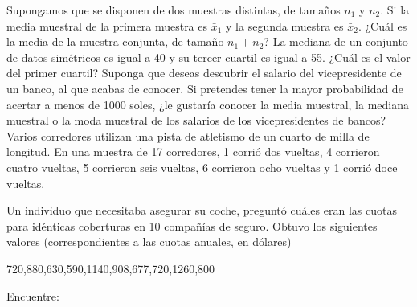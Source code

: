 \documentclass{exam}
\begin{document}
\begin{questions}
\question Supongamos que se disponen de dos muestras distintas, de tamaños $n_1$ y $n_2$. Si la media muestral de la primera muestra es $\bar{x}_1$ y la segunda muestra es $\bar{x}_2$. ¿Cuál es la media de la muestra conjunta, de tamaño $n_1+n_2$?
\question La mediana de un conjunto de datos simétricos es igual a 40 y su tercer cuartil es igual a 55. ¿Cuál es el valor del primer cuartil?
\question Suponga que deseas descubrir el salario del vicepresidente de un banco, al que acabas de conocer. Si pretendes tener la mayor probabilidad de acertar a menos de 1000 soles, ¿le gustaría conocer la media muestral, la mediana muestral o la moda muestral de los salarios de los vicepresidentes de bancos?
\question Varios corredores utilizan una pista de atletismo de un cuarto de milla de longitud. En una muestra de 17 corredores, 1 corrió dos vueltas, 4 corrieron cuatro vueltas, 5 corrieron seis vueltas, 6 corrieron ocho vueltas y 1 corrió doce vueltas.
\question Un individuo que necesitaba asegurar su coche, preguntó cuáles eran las cuotas para idénticas coberturas en 10 compañías de seguro. Obtuvo los siguientes valores (correspondientes a las cuotas anuales, en dólares)
\begin{center}
	720,880,630,590,1140,908,677,720,1260,800
\end{center}
Encuentre:
\end{questions}
\end{document}
